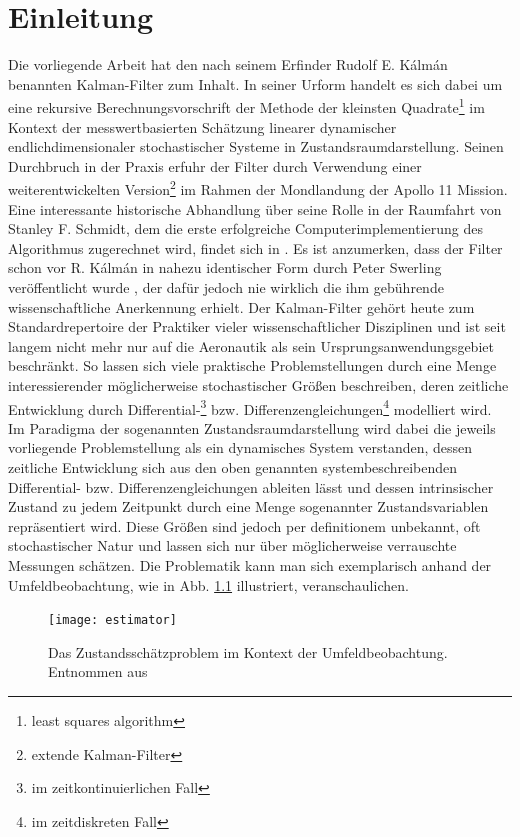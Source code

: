 \documentclass[12pt,a4paper,headsepline,bibliography=totoc,listof=totoc,headinclude=false,footinclude=false,BCOR5mm]{scrreprt} %
\begin{document}

\tableofcontents


 
\chapter{Einleitung}\label{einl}

Die vorliegende Arbeit hat den nach seinem Erfinder Rudolf E. K\'alm\'an benannten Kalman-Filter\cite{Kalman1960,Kalman1961} zum Inhalt. In seiner Urform handelt es sich dabei um eine rekursive Berechnungsvorschrift der Methode der kleinsten Quadrate\footnote{least squares algorithm}\cite{Legendre1805,Gauss1809} im Kontext der messwertbasierten Sch\"atzung linearer dynamischer endlichdimensionaler stochastischer Systeme in Zustandsraumdarstellung.
Seinen Durchbruch in der Praxis erfuhr der Filter durch Verwendung einer weiterentwickelten Version\footnote{extende Kalman-Filter} im Rahmen der Mondlandung der Apollo 11 Mission\cite{Schmidt1985}. Eine interessante historische Abhandlung \"uber seine Rolle in der Raumfahrt von Stanley F. Schmidt, dem die erste erfolgreiche Computerimplementierung des Algorithmus zugerechnet wird, findet sich in \cite{Schmidt1985}. Es ist anzumerken, dass der Filter schon vor  R. K\'alm\'an in nahezu identischer Form durch Peter Swerling ver{\"o}ffentlicht wurde  \cite{Swerling1958,Swerling1959}, der daf{\"u}r jedoch nie wirklich die ihm geb{\"u}hrende wissenschaftliche Anerkennung erhielt. Der Kalman-Filter geh\"ort heute zum Standardrepertoire der Praktiker vieler wissenschaftlicher Disziplinen und ist seit langem nicht mehr nur auf die Aeronautik als sein Ursprungsanwendungsgebiet beschr{\"a}nkt. So lassen sich viele praktische Problemstellungen durch eine Menge interessierender m{\"o}glicherweise stochastischer Gr\"o{\ss}en beschreiben, deren zeitliche Entwicklung durch Differential-\footnote{im zeitkontinuierlichen Fall} bzw. Differenzengleichungen\footnote{im zeitdiskreten Fall} modelliert wird. Im Paradigma der sogenannten Zustandsraumdarstellung wird dabei die jeweils vorliegende Problemstellung als ein dynamisches System verstanden, dessen zeitliche Entwicklung sich aus den oben genannten systembeschreibenden Differential- bzw. Differenzengleichungen ableiten l\"asst und dessen intrinsischer Zustand zu jedem Zeitpunkt durch eine Menge sogenannter Zustandsvariablen repr\"asentiert wird. Diese Gr\"o{\ss}en sind jedoch per definitionem unbekannt, oft stochastischer Natur und lassen sich nur \"uber m\"oglicherweise verrauschte Messungen sch\"atzen. Die Problematik kann man sich exemplarisch anhand der Umfeldbeobachtung, wie in Abb. \ref{beob} illustriert, veranschaulichen. \begin{figure}[h!]
    \centering
    \texttt{[image: estimator]}
\caption{Das Zustandssch\"atzproblem im Kontext der Umfeldbeobachtung. \\ Entnommen aus \cite[S. 72]{OReilly1996TLM} }\label{beob}
\end{figure}
\end{document}
